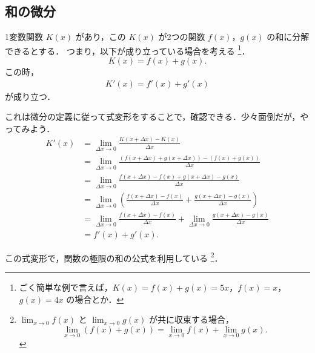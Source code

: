 \subsection{和の微分}
    1変数関数 $K(x)$ があり，この $K(x)$ が2つの関数 $f(x)$，$g(x)$ の和に分解できるとする．
    つまり，以下が成り立っている場合を考える
        \footnote{
            ごく簡単な例で言えば，$K(x)=f(x)+g(x)=5x$，$f(x)=x$，$g(x)=4x$ の場合とか．
        }．
        \begin{equation*}
            K(x) = f(x) + g(x).
        \end{equation*}
    この時，
         \begin{align}
             K'(x) = f'(x) + g'(x)
         \end{align}
    が成り立つ．

    これは微分の定義に従って式変形をすることで，確認できる．少々面倒だが，やってみよう．
        \begin{align*}
            K'(x) &= \lim_{\Delta x \to 0} \frac{K(x+\Delta x)-K(x)}{\Delta x} \\
                  &= \lim_{\Delta x \to 0}
                     \frac{\left(f(x+\Delta x)+g(x+\Delta x)\right)-\left( f(x)+g(x)\right)}{\Delta x} \\
                  &= \lim_{\Delta x \to 0}
                     \frac{f(x+\Delta x)-f(x) + g(x+\Delta x)-g(x)}{\Delta x} \\
                  &= \lim_{\Delta x \to 0}
                     \left(
                         \frac{f(x+\Delta x)-f(x)}{\Delta x}+\frac{g(x+\Delta x)-g(x)}{\Delta x}
                     \right) \\
                  &= \lim_{\Delta x \to 0} \frac{f(x+\Delta x)-f(x)}{\Delta x}
                   + \lim_{\Delta x \to 0} \frac{g(x+\Delta x)-g(x)}{\Delta x} \\
                  &= f'(x) + g'(x).
        \end{align*}

    この式変形で，関数の極限の和の公式を利用している
        \footnote{
            $\displaystyle\lim_{x \to 0}f(x)$ と $\displaystyle\lim_{x \to 0}g(x)$ が共に収束する場合，
            \begin{equation*}
                \lim_{x \to 0}(f(x)+g(x)) = \lim_{x \to 0}f(x) + \lim_{x \to 0}g(x).
            \end{equation*}
        }．

